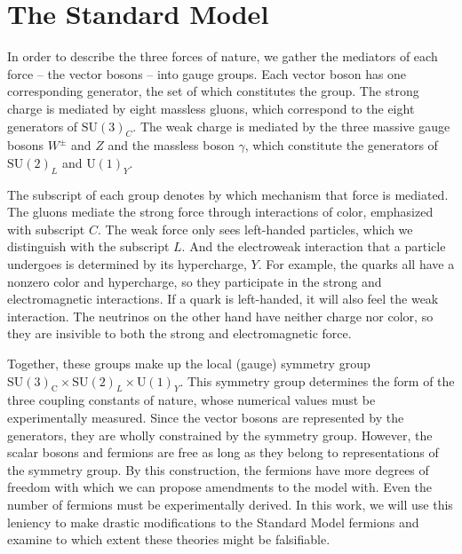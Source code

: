 % 
\section{The Standard Model}\label{ch:SM}
In order to describe the three forces of nature, we gather the mediators of each force -- the vector bosons -- into gauge groups. 
Each vector boson has one corresponding generator, the set of which constitutes the group.
The strong charge is mediated by eight massless gluons, which correspond to the eight generators of $\text{SU}(3)_C$. 
The weak charge is mediated by the three massive gauge bosons $W^\pm$ and $Z$ and the massless boson $\gamma$, 
which constitute the generators of $\text{SU}(2)_L$ and $\text{U}(1)_Y$. 

The subscript of each group denotes by which mechanism that force is mediated. The gluons mediate the strong force through interactions of color, emphasized with subscript $C$. The weak force only sees left-handed particles, 
which we distinguish with the subscript $L$. And the electroweak interaction that a particle undergoes is determined by its hypercharge, $Y$. For example, the quarks all have a nonzero color and hypercharge, 
so they participate in the strong and electromagnetic interactions. If a quark is left-handed, it will also feel the weak interaction. The neutrinos on the other hand have neither charge nor color, so they are insivible to both the strong and electromagnetic force.

Together, these groups make up the local (gauge) symmetry group $\mathrm{SU}(3)_{\mathrm{C}} \times \mathrm{SU}(2)_{L} \times \mathrm{U}(1)_{Y}$. 
This symmetry group determines the form of the three coupling constants of nature, whose numerical values must be experimentally measured. 
Since the vector bosons are represented by the generators, they are wholly constrained by the symmetry group. However, the scalar bosons and fermions are free as long as they
belong to representations of the symmetry group. By this construction, the fermions have more degrees of freedom with which we can propose amendments to the model with. Even the
number of fermions must be experimentally derived. In this work,
we will use this leniency to make drastic modifications to the Standard Model fermions and examine to which extent these theories might be falsifiable.


